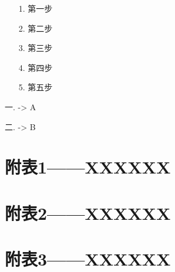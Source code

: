 \documentclass[withoutpreface,bwprint]{cumcmthesis}
\begin{document}
		\quad \begin{itemize}
			\item[1.] 第一步
			\item[2.] 第二步
			\item[3.] 第三步
			\item[4.] 第四步
			\item[5.] 第五步
		\end{itemize}
	
	


	


	
	
	
一. -> A
	
二. -> B
	
	\appendix 
		
			\section{附表1——XXXXXX}
			
			\section{附表2——XXXXXX}
			
			\section{附表3——XXXXXX}
	
\end{document}
